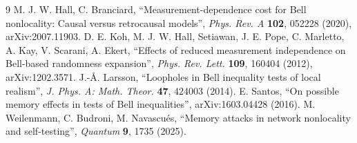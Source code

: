 \documentclass[
  11pt,
]{article}
\begin{document}
\begin{thebibliography}{9}
 M. J. W. Hall, C. Branciard, ``Measurement-dependence cost for Bell nonlocality: Causal versus retrocausal models'', \textit{Phys. Rev. A} \textbf{102}, 052228 (2020), arXiv:2007.11903.
 D. E. Koh, M. J. W. Hall, Setiawan, J. E. Pope, C. Marletto, A. Kay, V. Scarani, A. Ekert, ``Effects of reduced measurement independence on Bell-based randomness expansion'', \textit{Phys. Rev. Lett.} \textbf{109}, 160404 (2012), arXiv:1202.3571.
 J.-Å. Larsson, ``Loopholes in Bell inequality tests of local realism'', \textit{J. Phys. A: Math. Theor.} \textbf{47}, 424003 (2014).
 E. Santos, ``On possible memory effects in tests of Bell inequalities'', arXiv:1603.04428 (2016).
 M. Weilenmann, C. Budroni, M. Navascués, ``Memory attacks in network nonlocality and self-testing'', \textit{Quantum} \textbf{9}, 1735 (2025).
\end{thebibliography}
\end{document}

